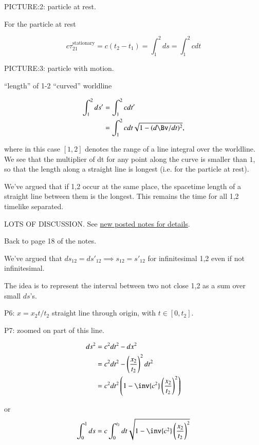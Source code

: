 PICTURE:2: particle at rest.

For the particle at rest 

\begin{equation}\label{eqn:relativisticElectrodynamicsL5:30}
c \tau_{21}^\text{stationary} = c ( t_2 - t_1 ) = \int_1^2 ds = \int_1^2 c dt
\end{equation}

PICTURE:3: particle with motion.

``length'' of 1-2 ``curved'' worldline

\begin{align*}
\int_1^2 ds' 
&= \int_1^2 c dt' \\
&= \int_1^2 c dt \sqrt{ 1 - (d\Bv/dt)^2 },
\end{align*}

where in this case $[1,2]$ denotes the range of a line integral over the worldline.  We see that the multiplier of dt for any point along the curve is smaller than $1$, so that the length along a straight line is longest (i.e. for the particle at rest).

We've argued that if 1,2 occur at the same place, the spacetime length of a straight line between them is the longest.  This remains the time  for all 1,2 timelike separated.

LOTS OF DISCUSSION.  See \href{http://www.physics.utoronto.ca/~poppitz/epoppitz/PHY450_files/pp.24.1-24.4.pdf}{new posted notes for details}.

Back to page 18 of the notes.

We've argued that $ds_{12} = {ds'}_{12} \implies s_{12} = {s'}_{12}$ for infinitesimal 1,2 even if not infinitesimal.

The idea is to represent the interval between two not close 1,2 as a sum over small $ds$'s.

P6: $x = x_2 t /t_2$ straight line through origin, with $t \in [0, t_2]$.

P7: zoomed on part of this line.

\begin{align*}
ds^2 
&= c^2 dt^2 - dx^2 \\
&= c^2 dt^2 - \left(\frac{x_2}{t_2}\right)^2 dt^2 \\
&= c^2 dt^2 \left( 1 - \inv{c^2} \left(\frac{x_2}{t_2}\right)^2 \right) \\
\end{align*}

or
\begin{equation}\label{eqn:relativisticElectrodynamicsL5:40}
\int_0^1 ds 
= c \int_0^{t_2} dt \sqrt{ 1 - \inv{c^2} \left(\frac{x_2}{t_2}\right)^2 } 
\end{equation}

